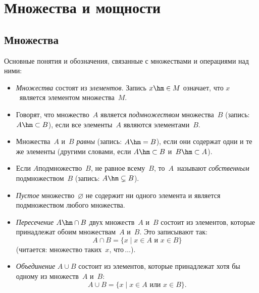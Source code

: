 \chapter{Множества и мощности}
        \label{sets-cardinalities}

\section{Множества}
        \label{sets}

Основные понятия и обозначения, связанные с множествами
и операциями над ними:

\begin{itemize}

\item
\emph{Множества} состоят из
\emph{элементов}.
Запись $x\hm\in M$ означает, что $x$~является элементом множества~$M$.

\item
Говорят, что множество~$A$ является \emph{подмножеством}
множества~$B$ (запись: $A\hm\subset B$\index{$\subset$}),
если все элементы~$A$ являются элементами~$B$.

\item
Множества~$A$ и~$B$
\emph{равны}
(запись: $A\hm=B$), если они
содержат одни и те же элементы (другими словами, если
$A\hm\subset B$ и~$B\hm\subset A$).

\item
Если $A$\т подмножество~$B$, не равное всему~$B$, то~$A$~называют
\emph{собственным} подмножеством~$B$
(запись: $A\hm\subsetneq B$\index{$\subsetneq$}).

\item
\emph{Пустое}
множество~$\varnothing$ не содержит ни одного
элемента и является подмножеством любого множества.

\item
\emph{Пересечение}
$A\hm\cap B$\index{$\cap$} двух множеств~$A$ и~$B$
состоит из элементов, которые принадлежат обоим множествам~$A$
и~$B$. Это записывают так:
        $$
A \cap B = \{ x\mid x\in A \text{ и } x\in B\}
        $$
(читается: множество таких~$x$, что\,$\dots$).

\item
\emph{Объединение}
$A\cup B$\index{$\cup$} состоит из элементов, которые принадлежат хотя
бы одному из множеств~$A$ и~$B$:
        $$
A \cup B = \{ x\mid x\in A \text{ или } x\in B\}.
        $$


\end{itemize}
